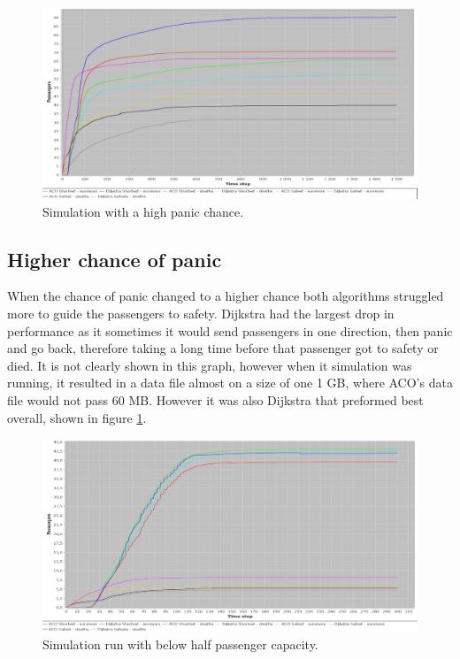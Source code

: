 \begin{figure} [h]
\centering
\hspace*{-1.0in}
\includegraphics[scale=0.35]{images/Graph-using-200-rounds-140-passangers-and-high-panic.png}
\caption{Simulation with a high panic chance.}
\label{fig:celebHPanic}
\end{figure}

\subsection{Higher chance of panic}

When the chance of panic changed to a higher chance both algorithms struggled more to guide the passengers to safety. Dijkstra had the largest drop in performance as it sometimes it would send passengers in one direction, then panic and go back, therefore taking a long time before that passenger got to safety or died. It is not clearly shown in this graph, however when it simulation was running, it resulted in a data file almost on a size of one 1 GB, where ACO's data file would not pass 60 MB. However it was also Dijkstra that preformed best overall, shown in figure \ref{fig:celebHPanic}.

\begin{figure} [h]
\centering
\hspace*{-1.0in}
\includegraphics[scale=0.35]{images/Graph-using-200-rounds-50-passangers.png}
\caption{Simulation run with below half passenger capacity.}
\label{fig:celeb50}
\end{figure}

